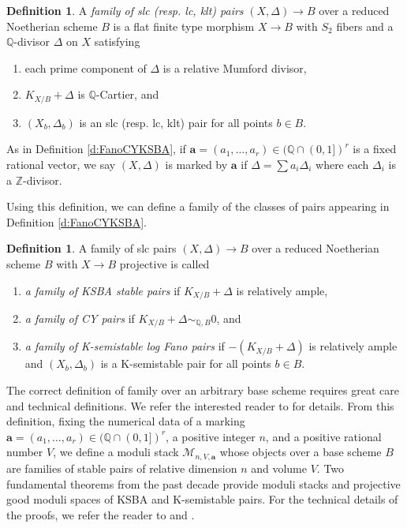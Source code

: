 \documentclass[11pt]{amsart}
\numberwithin{equation}{section}
\theoremstyle{definition}
\newtheorem{defn}[theorem]{Definition}
\newcommand{\bQ}{\mathbb{Q}}
\newcommand{\calM}{\mathcal{M}}
\newcommand{\bZ}{\mathbb{Z}}
\begin{document}
\begin{defn}\label{def:mumford}	
A \emph{family of slc (resp. lc, klt) pairs} $(X,\Delta) \to B$  over a reduced Noetherian scheme $B$
is a flat finite type morphism $X\to B$ with $S_2$ fibers and a $\bQ$-divisor $\Delta$ on $X$   satisfying
\begin{enumerate}
\item each prime component of $\Delta$ is a relative Mumford divisor,
\item $K_{X/B} +\Delta$ is $\bQ$-Cartier, and
\item  $(X_b,\Delta_b)$ is an slc (resp. lc, klt) pair for all points $b\in B$.
\end{enumerate}

As in Definition \ref{d:FanoCYKSBA}, if $\mathbf{a} = (a_1, \dots, a_r) \in (\bQ\cap (0,1])^r$ is a fixed rational vector, we say $(X, \Delta)$ is marked by $\mathbf{a}$ if $\Delta = \sum a_i \Delta_i$ where each $\Delta_i$ is a $\bZ$-divisor. 
\end{defn}

Using this definition, we can define a family of the classes of pairs appearing in Definition \ref{d:FanoCYKSBA}.


\begin{defn}
A  family of slc pairs $(X,\Delta)\to B$ over a reduced Noetherian scheme $B$ with $X\to B$ projective is called 
\begin{enumerate}
 \item \emph{a family of KSBA stable pairs} if $K_{X/B} + \Delta$ is relatively ample,
    \item \emph{a family of CY pairs} if $K_{X/B} + \Delta \sim_{\bQ,B} 0$, and
    \item \emph{a family of K-semistable log Fano pairs} if $-(K_{X/B}+\Delta)$ is relatively ample and $(X_b, \Delta_b)$ is a K-semistable pair for all points $b \in B$.
\end{enumerate}
\end{defn}

The correct definition of family over an arbitrary base scheme requires great care and technical definitions.  We refer the interested reader to \cite[Sections 6 - 8]{KolNewBook} for details.  From this definition, fixing the numerical data of a marking $\mathbf{a} = (a_1, \dots, a_r) \in (\bQ\cap (0,1])^r$, a positive integer $n$, and a positive rational number $V$, we define a moduli stack $\calM_{n,V,\mathbf{a}}$ whose objects over a base scheme $B$ are families of stable pairs of relative dimension $n$ and volume $V$.  Two fundamental theorems from the past decade provide moduli stacks and projective good moduli spaces of KSBA and K-semistable pairs.  For the technical details of the proofs, we refer the reader to \cite{KolNewBook} and \cite{Chenyang}. 
\end{document}
